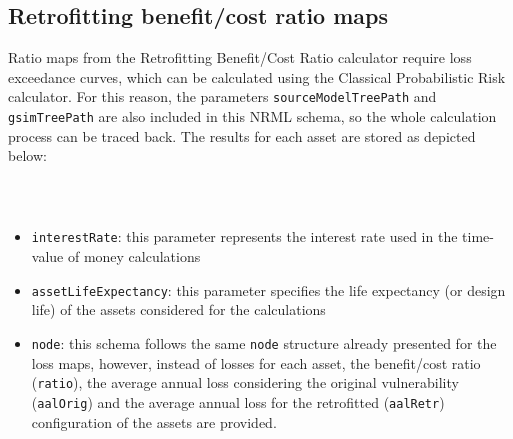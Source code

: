 \subsection{Retrofitting benefit/cost ratio maps}

Ratio maps from the Retrofitting Benefit/Cost Ratio calculator require loss
exceedance curves, which can be calculated using the Classical Probabilistic Risk
calculator. For this reason, the parameters \Verb+sourceModelTreePath+ and
\Verb+gsimTreePath+ are also included in this NRML schema, so the whole
calculation process can be traced back. The results for each \gls{asset} are
stored as depicted below:

\inputminted[firstline=1,firstnumber=1,fontsize=\footnotesize,frame=single,bgcolor=lightgray]{xml}{oqum/risk/verbatim/output_bcr_map.xml}\\


\begin{itemize}
  \item \Verb+interestRate+: this parameter represents the interest rate used
    in the time-value of money calculations

  \item \Verb+assetLifeExpectancy+: this parameter specifies the life expectancy
    (or design life) of the \glspl{asset} considered for the calculations

  \item \Verb+node+: this schema follows the same \Verb+node+ structure already
    presented for the loss maps, however, instead of losses for each
    \gls{asset}, the benefit/cost ratio (\Verb+ratio+), the average annual loss
    considering the original vulnerability (\Verb+aalOrig+) and the average
    annual loss for the retrofitted (\Verb+aalRetr+) configuration of the
    \glspl{asset} are provided.

\end{itemize}